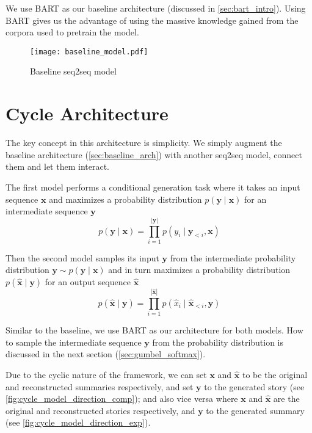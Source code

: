 We use BART \citep{lewis2019bart} as our baseline architecture (discussed in \cref{sec:bart_intro}). Using BART gives us the advantage of using the massive knowledge gained from the corpora used to pretrain the model.

\begin{figure}[ht]
\centering
\texttt{[image: baseline\_model.pdf]}
\caption{Baseline seq2seq model}
\label{fig:baseline_model}
\end{figure}



\section{Cycle Architecture}
\label{sec:cycle_arch}

The key concept in this architecture is simplicity. We simply augment the baseline architecture (\cref{sec:baseline_arch}) with another seq2seq model, connect them and let them interact.

The first model performs a conditional generation task where it takes an input sequence $\mathbf{x}$ and maximizes a probability distribution $p(\mathbf{y} \mid \mathbf{x})$ for an intermediate sequence $\mathbf{y}$
\[ p(\mathbf{y} \mid \mathbf{x}) = \prod_{i=1}^{|\mathbf{y}|} p(y_i \mid \mathbf{y}_{<i}, \mathbf{x})  \]

Then the second model samples its input $\mathbf{y}$ from the intermediate probability distribution $\mathbf{y} \sim p(\mathbf{y} \mid \mathbf{x})$ and in turn maximizes a probability distribution $p(\hat{\mathbf{x}} \mid \mathbf{y})$ for an output sequence $\hat{\mathbf{x}}$
\[ p(\hat{\mathbf{x}} \mid \mathbf{y}) = \prod_{i=1}^{|\hat{\mathbf{x}}|} p(\hat{x}_i \mid \hat{\mathbf{x}}_{<i}, \mathbf{y})  \]

Similar to the baseline, we use BART as our architecture for both models. How to sample the intermediate sequence $\mathbf{y}$ from the probability distribution is discussed in the next section (\cref{sec:gumbel_softmax}).

Due to the cyclic nature of the framework, we can set $\mathbf{x}$ and $\hat{\mathbf{x}}$ to be the original and reconstructed summaries respectively, and set $\mathbf{y}$ to the generated story (see \cref{fig:cycle_model_direction_comp}); and also vice versa where $\mathbf{x}$ and $\hat{\mathbf{x}}$ are the original and reconstructed stories respectively, and $\mathbf{y}$ to the generated summary (see \cref{fig:cycle_model_direction_exp}).

